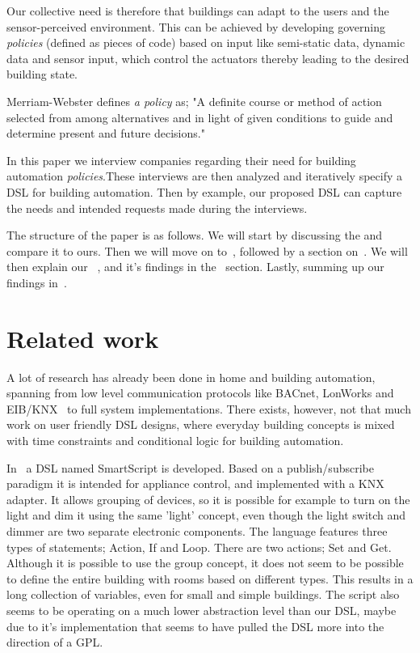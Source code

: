 \documentclass{llncs}
\begin{document}
Our collective need is therefore that buildings can adapt to the users and the sensor-perceived environment. This can be achieved by developing governing \textit{policies} (defined as pieces of code) based on input like semi-static data, dynamic data and sensor input, which control the actuators thereby leading to the desired building state.

Merriam-Webster defines \textit{a policy} as; "A definite course or method of action selected from among alternatives and in light of given conditions to guide and determine present and future decisions."

In this paper we interview companies regarding their need for building automation \textit{policies}.These interviews  are then analyzed and iteratively specify a DSL for building automation. Then by example, our proposed DSL can capture the needs and intended requests made during the interviews.

The structure of the paper is as follows. We will start by discussing the and compare it to ours. Then we will move on to~, followed by a section on~. We will then explain our~ , and it's findings in the~ section. Lastly, summing up our findings in~.

\section{Related work}\label{sec:relatedwork}
A lot of research has already been done in home and building automation, spanning from low level communication protocols like BACnet, LonWorks and EIB/KNX~\cite{communication} to full system implementations. There exists, however, not that much work on user friendly DSL designs, where everyday building concepts is mixed with time constraints and conditional logic for building automation. 

In~\cite{smartscript} a DSL named SmartScript is developed. Based on a publish/subscribe paradigm it is intended for appliance control, and implemented with a KNX adapter. It allows grouping of devices, so it is possible for example to turn on the light and dim it using the same 'light' concept, even though the light switch and dimmer are two separate electronic components. The language features three types of statements; Action, If and Loop. There are two actions; Set and Get. Although it is possible to use the group concept, it does not seem to be possible to define the entire building with rooms based on different types. This results in a long collection of variables, even for small and simple buildings. The script also seems to be operating on a much lower abstraction level than our DSL, maybe due to it's implementation that seems to have pulled the DSL more into the direction of a GPL. 
\end{document}
